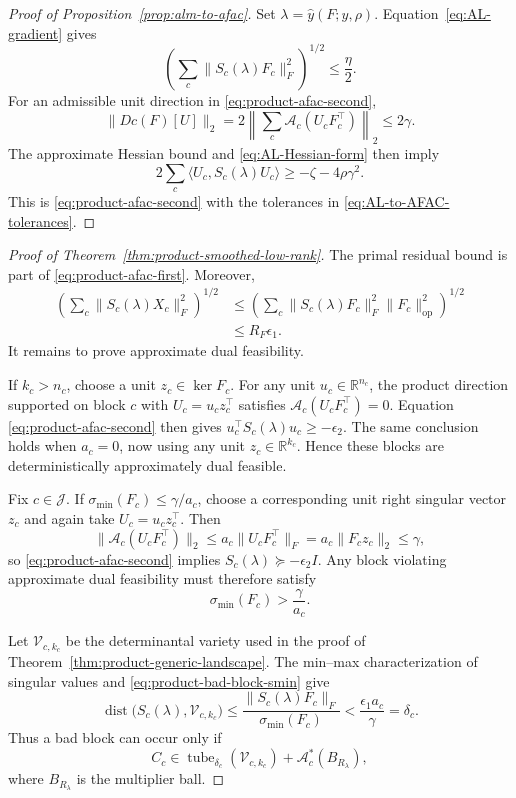 \documentclass[11pt]{article}
\theoremstyle{definition}
\theoremstyle{remark}
\begin{document}
\begin{proof}[Proof of Proposition~\ref{prop:alm-to-afac}]
Set $\lambda=\widehat y(F;y,\rho)$.  Equation~\eqref{eq:AL-gradient} gives
\[
  \left(\sum_c\|S_c(\lambda)F_c\|_F^2\right)^{1/2}
  \leq\frac{\eta}{2}.
\]
For an admissible unit direction in
\eqref{eq:product-afac-second},
\[
  \|Dc(F)[U]\|_2
  =2\left\|\sum_c\mathcal A_c(U_cF_c^\top)\right\|_2
  \leq2\gamma.
\]
The approximate Hessian bound and \eqref{eq:AL-Hessian-form} then imply
\[
  2\sum_c\langle U_c,S_c(\lambda)U_c\rangle
  \geq-\zeta-4\rho\gamma^2.
\]
This is \eqref{eq:product-afac-second} with the tolerances in
\eqref{eq:AL-to-AFAC-tolerances}.
\end{proof}

\begin{proof}[Proof of Theorem~\ref{thm:product-smoothed-low-rank}]
The primal residual bound is part of
\eqref{eq:product-afac-first}.  Moreover,
\begin{align*}
  \left(\sum_c\|S_c(\lambda)X_c\|_F^2\right)^{1/2}
  &\leq
  \left(\sum_c
    \|S_c(\lambda)F_c\|_F^2\|F_c\|_{\mathrm{op}}^2
  \right)^{1/2}\\
  &\leq R_F\epsilon_1.
\end{align*}
It remains to prove approximate dual feasibility.

If $k_c>n_c$, choose a unit $z_c\in\ker F_c$.  For any unit
$u_c\in\mathbb R^{n_c}$, the product direction supported on block $c$ with
$U_c=u_cz_c^\top$ satisfies
$\mathcal A_c(U_cF_c^\top)=0$.  Equation
\eqref{eq:product-afac-second} then gives
$u_c^\top S_c(\lambda)u_c\geq-\epsilon_2$.  The same conclusion holds when
$a_c=0$, now using any unit $z_c\in\mathbb R^{k_c}$.  Hence these blocks
are deterministically approximately dual feasible.

Fix $c\in\mathcal J$.  If
$\sigma_{\min}(F_c)\leq\gamma/a_c$, choose a corresponding unit right
singular vector $z_c$ and again take $U_c=u_cz_c^\top$.  Then
\[
  \|\mathcal A_c(U_cF_c^\top)\|_2
  \leq a_c\|U_cF_c^\top\|_F
  =a_c\|F_cz_c\|_2
  \leq\gamma,
\]
so \eqref{eq:product-afac-second} implies
$S_c(\lambda)\succeq-\epsilon_2I$.  Any block violating approximate dual
feasibility must therefore satisfy
\begin{equation}
  \sigma_{\min}(F_c)>\frac{\gamma}{a_c}.
  \label{eq:product-bad-block-smin}
\end{equation}

Let $\mathcal V_{c,k_c}$ be the determinantal variety used in the proof of
Theorem~\ref{thm:product-generic-landscape}.  The min--max characterization
of singular values and \eqref{eq:product-bad-block-smin} give
\[
  \operatorname{dist}\bigl(S_c(\lambda),\mathcal V_{c,k_c}\bigr)
  \leq
  \frac{\|S_c(\lambda)F_c\|_F}
       {\sigma_{\min}(F_c)}
  <\frac{\epsilon_1a_c}{\gamma}
  =\delta_c.
\]
Thus a bad block can occur only if
\begin{equation}
  C_c\in
  \operatorname{tube}_{\delta_c}(\mathcal V_{c,k_c})
  +\mathcal A_c^*(B_{R_\lambda}),
  \label{eq:product-bad-cost-tube}
\end{equation}
where $B_{R_\lambda}$ is the multiplier ball.


\end{proof}
\end{document}
